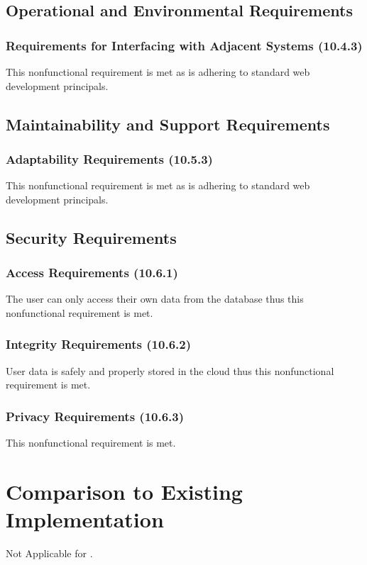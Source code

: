 \documentclass[12pt, titlepage]{article}
\begin{document}
\subsection{Operational and Environmental Requirements}
\subsubsection{Requirements for Interfacing with Adjacent Systems (10.4.3)}
This nonfunctional requirement is met as \progname is adhering to standard web development principals.

\subsection{Maintainability and Support Requirements}
\subsubsection{Adaptability Requirements (10.5.3)}
This nonfunctional requirement is met as \progname is adhering to standard web development principals.

\subsection{Security Requirements}
\subsubsection{Access Requirements (10.6.1)}
The user can only access their own data from the database thus this nonfunctional requirement is met.

\subsubsection{Integrity Requirements (10.6.2)}
User data is safely and properly stored in the cloud thus this nonfunctional requirement is met.

\subsubsection{Privacy Requirements (10.6.3)}
This nonfunctional requirement is met.

\section{Comparison to Existing Implementation}	
Not Applicable for \progname .
\end{document}
